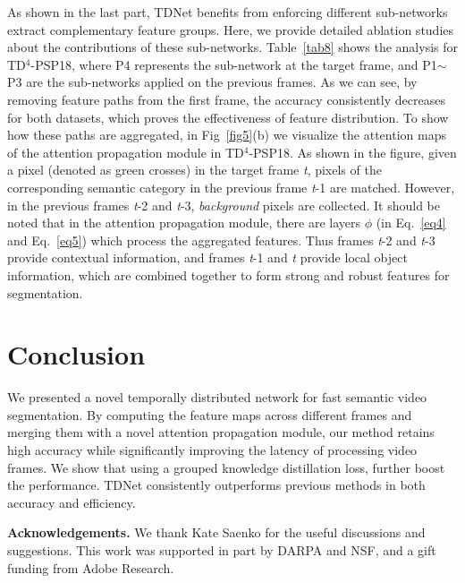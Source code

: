 \documentclass[10pt,twocolumn,letterpaper]{article}
\makeatletter
\renewcommand{\paragraph}{\@startsection{paragraph}{4}{\z@}{2.25ex \@plus 1ex \@minus .2ex}{-1em}{\normalfont\normalsize\bfseries}}
\makeatother
\begin{document}
\paragraph{Effect of Sub-networks.} 
As shown in the last part, TDNet benefits from enforcing different sub-networks extract complementary feature groups.
Here, we provide detailed ablation studies about the contributions of these sub-networks.
Table~\ref{tab8} shows the analysis for TD$^4$-PSP18, where P4 represents the sub-network at the target frame, and P1$\sim$P3 are the sub-networks applied on the previous frames. 
As we can see, by removing feature paths from the first frame, the accuracy consistently decreases for both datasets, which proves the effectiveness of feature distribution. 
To show how these paths are aggregated, in Fig~\ref{fig5}(b) we visualize the attention maps of the attention propagation module in TD$^4$-PSP18.
As shown in the figure, given a pixel (denoted as green crosses) in the target frame \textit{t}, pixels of the corresponding semantic category in the previous frame \textit{t}-1 are matched. 
However, in the previous frames \textit{t}-2 and \textit{t}-3, \emph{background} pixels are collected. 
It should be noted that in the attention propagation module, there are layers $\phi$ (in Eq.~\ref{eq4} and Eq.~\ref{eq5}) which process the aggregated features. 
Thus frames \textit{t}-2 and \textit{t}-3 provide contextual information, and frames \textit{t}-1 and \textit{t} provide local object information, which are combined together to form strong and robust features for segmentation.










 \section{Conclusion}
We presented a novel temporally distributed network for fast semantic video segmentation. 
By computing the feature maps across different frames and merging them with a novel attention propagation module, our method  retains high accuracy while significantly improving the latency of processing video frames. 
We show that using a grouped knowledge distillation loss, further boost the performance. TDNet consistently outperforms previous methods in both accuracy and efficiency.

\noindent \textbf{Acknowledgements.} We thank Kate Saenko for the useful discussions and suggestions. This work was supported in part by DARPA and NSF, and a gift funding from Adobe Research. 
{\small


}
\end{document}
